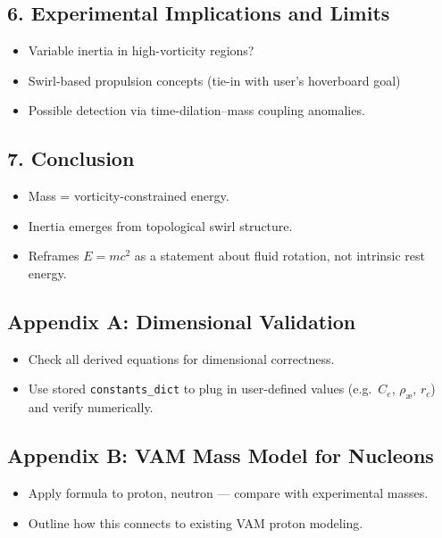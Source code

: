 \documentclass[twocolumn,aps,pre,floatfix,nofootinbib]{revtex4-2}
\begin{document}
\subsection*{6. Experimental Implications and Limits}

\begin{itemize}
    \item Variable inertia in high-vorticity regions?
    \item Swirl-based propulsion concepts (tie-in with user’s hoverboard goal)
    \item Possible detection via time-dilation--mass coupling anomalies.
\end{itemize}

\subsection*{7. Conclusion}

\begin{itemize}
    \item Mass = vorticity-constrained energy.
    \item Inertia emerges from topological swirl structure.
    \item Reframes $E=mc^2$ as a statement about fluid rotation, not intrinsic rest energy.
\end{itemize}

\subsection*{Appendix A: Dimensional Validation}

\begin{itemize}
    \item Check all derived equations for dimensional correctness.
    \item Use stored \texttt{constants\_dict} to plug in user-defined values (e.g.\ $C_e$, $\rho_\text{\ae}$, $r_c$) and verify numerically.
\end{itemize}


\subsection*{Appendix B: VAM Mass Model for Nucleons}

\begin{itemize}
    \item Apply formula to proton, neutron — compare with experimental masses.
    \item Outline how this connects to existing VAM proton modeling.
\end{itemize}
\end{document}
